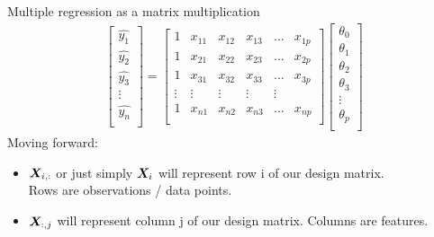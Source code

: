 \documentclass[aspectratio=169]{../latex_main/tntbeamer}  %
\begin{document}
	
	\begin{frame}{Multiple regression as a matrix multiplication}
	  \begin{align*}
	       \left[\begin{array}{c}
	          \hat{y_1}\\ 
	          \hat{y_2}\\ 
	          \hat{y_3}\\ 
	          \vdots  \\
	          \hat{y_n}\\ 
	    \end{array}\right] = \left[\begin{array}{cccccc}
	          1 & x_{11} & x_{12} & x_{13} & \dots & x_{1p}\\
	          1 & x_{21} & x_{22} & x_{23} & \dots & x_{2p}\\
	          1 & x_{31} & x_{32} & x_{33} & \dots & x_{3p}\\
	          \vdots     & \vdots & \vdots &\vdots &  \vdots \\
	          1 & x_{n1} & x_{n2} & x_{n3} & \dots & x_{np}\\
	    \end{array}\right]
	    \left[\begin{array}{c}
	          \theta_0\\
	          \theta_1\\ 
	          \theta_2\\ 
	          \theta_3\\ 
	          \vdots  \\
	          \theta_p\\ 
	    \end{array}\right]
	  \end{align*}
	  Moving forward:

	  \begin{itemize}
	      \item    $\bm{X}_{i,:}$ or just simply $\bm{X}_{i}$ will represent row i of our design matrix.\\ Rows are observations / data points.
          \item   $\bm{X}_{:,j}$ will represent column j of our design matrix. Columns are features.

	  \end{itemize}
	\end{frame}
	
\end{document}
